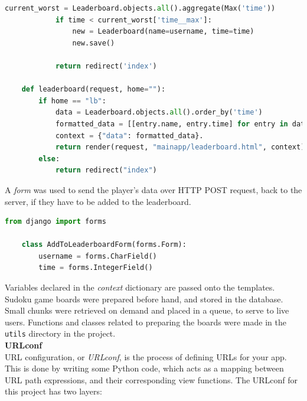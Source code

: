 \documentclass[12pt, a4paper]{report}
\begin{document}
\begin{lstlisting}[language=Python, caption=mainapp/views.py]
            current_worst = Leaderboard.objects.all().aggregate(Max('time'))
            if time < current_worst['time__max']:
                new = Leaderboard(name=username, time=time)
                new.save()
    
            return redirect('index') 
    
    def leaderboard(request, home=""):
        if home == "lb":
            data = Leaderboard.objects.all().order_by('time')
            formatted_data = [[entry.name, entry.time] for entry in data][:10]
            context = {"data": formatted_data}.
            return render(request, "mainapp/leaderboard.html", context)
        else:
            return redirect("index")
    \end{lstlisting}
    A \emph{form} was used to send the player's data over HTTP POST request, back to the server, if they have to be added to the leaderboard.
    \begin{lstlisting}[language=Python, caption=mainapp/forms.py]
    from django import forms

    class AddToLeaderboardForm(forms.Form):
        username = forms.CharField()
        time = forms.IntegerField()
    \end{lstlisting}
    Variables declared in the \textit{context} dictionary are passed onto the templates.\\
    Sudoku game boards were prepared before hand, and stored in the database. Small chunks were retrieved on demand and placed in a queue, to serve to live users.
    Functions and classes related to preparing the boards were made in the \texttt{utils} directory in the project.\\
    \newline
    \textbf{URLconf}\\
    URL configuration, or \textit{URLconf}, is the process of defining URLs for your app. This is done by writing some Python code, which acts as a mapping between URL path expressions, and their corresponding view functions.
    The URLconf for this project has two layers:
\end{document}

